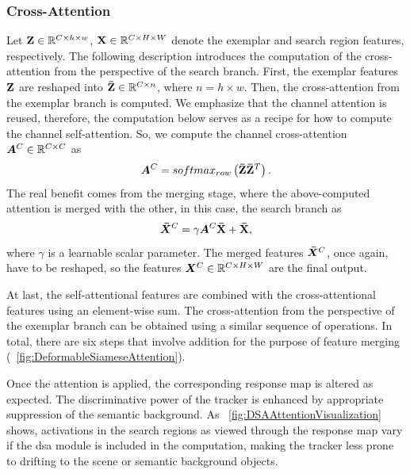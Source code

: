 \subsubsection{Cross-Attention}

Let $\mathbf{Z} \in \mathbb{R}^{{C} \times {h} \times {w}}$, $\mathbf{X} \in \mathbb{R}^{{C} \times {H} \times {W}}$ denote the exemplar and search region features, respectively. The following description introduces the computation of the cross-attention from the perspective of the search branch. First, the exemplar features $\mathbf{Z}$ are reshaped into $\mathbf{\bar{Z}} \in \mathbb{R}^{{C} \times {n}}$, where $n = h \times w$. Then, the cross-attention from the exemplar branch is computed. We emphasize that the channel attention is reused, therefore, the computation below serves as a recipe for how to compute the channel self-attention. So, we compute the channel cross-attention $\bm{A}^{C} \in \mathbb{R}^{{C} \times {C}}$ as
\begin{equation}
  \label{eq:CrossAttentionCalc}
  \bm{A}^{C} =
  {softmax_{row}} \left( \mathbf{\bar{Z}} \mathbf{\bar{Z}}^T \right).
\end{equation}
The real benefit comes from the merging stage, where the above-computed attention is merged with the other, in this case, the search branch as
\begin{equation}
  \label{eq:CrossAttentionMerge}
  \bm{\bar{X}}^{C} =
  \gamma \bm{A}^{C} \mathbf{\bar{X}} + \mathbf{\bar{X}},
\end{equation}
where $\gamma$ is a learnable scalar parameter. The merged features $\bm{\bar{X}}^{C}$, once again, have to be reshaped, so the features $\bm{X}^{C} \in \mathbb{R}^{{C} \times {H} \times {W}}$ are the final output.

At last, the self-attentional features are combined with the cross-attentional features using an element-wise sum. The cross-attention from the perspective of the exemplar branch can be obtained using a similar sequence of operations. In total, there are six steps that involve addition for the purpose of feature merging (\figtext{}~\ref{fig:DeformableSiameseAttention}).

Once the attention is applied, the corresponding response map is altered as expected. The discriminative power of the tracker is enhanced by appropriate suppression of the semantic background. As \figtext{}~\ref{fig:DSAAttentionVisualization} shows, activations in the search regions as viewed through the response map vary if the \gls{dsa} module is included in the computation, making the tracker less prone to drifting to the scene or semantic background objects.

